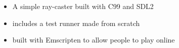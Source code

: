 \documentclass[10pt,a4paper,ragged2e,withhyper]{altacv}
\begin{document}
\begin{paracol}{2}
	\divider

	\begin{itemize}
		\item A simple ray-caster built with C99 and SDL2
		\item includes a test runner made from scratch
		\item built with Emscripten to allow people to play online
	\end{itemize}
\end{paracol}
\end{document}
